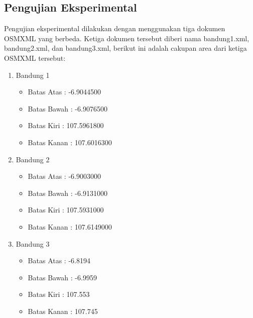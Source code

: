 \subsection{Pengujian Eksperimental}
Pengujian eksperimental dilakukan dengan menggunakan tiga dokumen OSMXML yang
berbeda. Ketiga dokumen tersebut diberi nama bandung1.xml, bandung2.xml, dan
bandung3.xml, berikut ini adalah cakupan area dari ketiga OSMXML tersebut:
\begin{enumerate}
  \item Bandung 1
  \begin{itemize}
    \item Batas Atas : -6.9044500
    
    \item Batas Bawah : -6.9076500
    
    \item Batas Kiri : 107.5961800
    
    \item Batas Kanan : 107.6016300
  \end{itemize}

  \item Bandung 2
  \begin{itemize}
    \item Batas Atas : -6.9003000
    
    \item Batas Bawah : -6.9131000
    
    \item Batas Kiri : 107.5931000
    
    \item Batas Kanan : 107.6149000
  \end{itemize}
  
  \item Bandung 3
  \begin{itemize}
    \item Batas Atas : -6.8194
    
    \item Batas Bawah : -6.9959
    
    \item Batas Kiri : 107.553
    
    \item Batas Kanan : 107.745
  \end{itemize}
\end{enumerate}

\setcounter{secnumdepth}{3}
\setcounter{tocdepth}{3}
